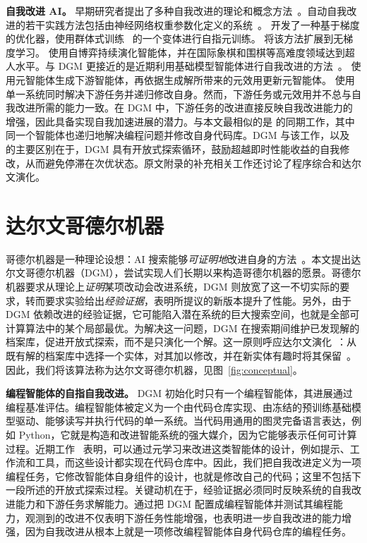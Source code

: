 \documentclass[10pt,twocolumn]{article}
\begin{document}
\textbf{自我改进 AI。}
早期研究者提出了多种自我改进的理论和概念方法~\citep{good1966speculations,schmidhuber1987evolutionary,schmidhuber2007godel}。自动自我改进的若干实践方法包括由神经网络权重参数化定义的系统~\citep{schmidhuber1993self,hall2007self,hobbhahn2025swebenchmini,kirsch2022self,irie2022modern,irie2025metalearning,lu2023arbitrary,havrilla2024glore}。\citet{metz2021training} 开发了一种基于梯度的优化器，使用群体式训练~\citep{jaderberg2017population} 的一个变体进行自指元训练。\citet{lange2023discovering} 将该方法扩展到无梯度学习。\citet{silver2017mastering} 使用自博弈持续演化智能体，并在国际象棋和围棋等高难度领域达到超人水平。与 DGM 更接近的是近期利用基础模型智能体进行自我改进的方法~\citep{yin2024g,robeyns2025self,hu2024self,zelikman2024self,huang2022large,singh2023beyond}。\citet{zelikman2024self} 使用元智能体生成下游智能体，再依据生成解所带来的元效用更新元智能体。\citet{yin2024g} 使用单一系统同时解决下游任务并递归修改自身。然而，下游任务或元效用并不总与自我改进所需的能力一致。在 DGM 中，下游任务的改进直接反映自我改进能力的增强，因此具备实现自我加速进展的潜力。与本文最相似的是 \citet{robeyns2025self} 的同期工作，其中同一个智能体也递归地解决编程问题并修改自身代码库。DGM 与该工作，以及 \citet{zelikman2024self,yin2024g} 的主要区别在于，DGM 具有开放式探索循环，鼓励超越即时性能收益的自我修改，从而避免停滞在次优状态。原文附录的补充相关工作还讨论了程序综合和达尔文演化。

\section{达尔文哥德尔机器}
\label{sec:methods}

哥德尔机器是一种理论设想：AI 搜索能够\emph{可证明地}改进自身的方法~\citep{schmidhuber2007godel}。本文提出达尔文哥德尔机器（DGM），尝试实现人们长期以来构造哥德尔机器的愿景。哥德尔机器要求从理论上\emph{证明}某项改动会改进系统，DGM 则放宽了这一不切实际的要求，转而要求实验给出\emph{经验证据}，表明所提议的新版本提升了性能。另外，由于 DGM 依赖改进的经验证据，它可能陷入潜在系统的巨大搜索空间，也就是全部可计算算法中的某个局部最优。为解决这一问题，DGM 在搜索期间维护已发现解的档案库，促进开放式探索，而不是只演化一个解。这一原则呼应达尔文演化~\citep{darwin2023origin}：从既有解的档案库中选择一个实体，对其加以修改，并在新实体有趣时将其保留~\citep{zhang2024omni,faldor2025omni,stanley2015greatness}。因此，我们将该算法称为达尔文哥德尔机器，见图~\ref{fig:conceptual}。

\textbf{编程智能体的自指自我改进。}
DGM 初始化时只有一个编程智能体，其进展通过编程基准评估。编程智能体被定义为一个由代码仓库实现、由冻结的预训练基础模型驱动、能够读写并执行代码的单一系统。当代码用通用的图灵完备语言表达，例如 Python，它就是构造和改进智能系统的强大媒介，因为它能够表示任何可计算过程。近期工作~\citep{hu2025automated,zhang2024aflow} 表明，可以通过元学习来改进这类智能体的设计，例如提示、工作流和工具，而这些设计都实现在代码仓库中。因此，我们把自我改进定义为一项编程任务，它修改智能体自身组件的设计，也就是修改自己的代码；这里不包括下一段所述的开放式探索过程。关键动机在于，经验证据必须同时反映系统的自我改进能力和下游任务求解能力。通过把 DGM 配置成编程智能体并测试其编程能力，观测到的改进不仅表明下游任务性能增强，也表明进一步自我改进的能力增强，因为自我改进从根本上就是一项修改编程智能体自身代码仓库的编程任务。
\end{document}
